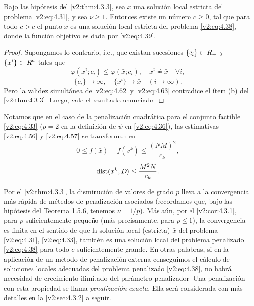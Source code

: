 \begin{corollary}\label{v2:cor:4.3.1}
    Bajo las hipótesis del \cref{v2:thm:4.3.3}, sea $\bar{x}$ una solución local estricta del problema \eqref{v2:eq:4.31}, y sea $\nu \ge 1$.
    Entonces existe un número $\bar{c} \ge 0$, tal que para todo $c > \bar{c}$ el punto $\bar{x}$ es una solución local estricta del problema \eqref{v2:eq:4.38}, donde la función objetivo es dada por \eqref{v2:eq:4.39}.
\end{corollary}
\begin{proof}
    Supongamos lo contrario, i.e., que existan sucesiones $\{c_i\} \subset R_+$ y $\{x^i\} \subset R^n$ tales que
    \begin{equation}
        \varphi(x^i; c_i) \le \varphi(\bar{x}; c_i), \quad x^i \neq \bar{x} \quad \forall i,
        \label{v2:eq:4.62}
    \end{equation}
    \begin{equation}
        \{c_i\} \to \infty, \quad \{x^i\} \to \bar{x} \quad (i \to \infty).
        \label{v2:eq:4.63}
    \end{equation}
    Pero la validez simultánea de \eqref{v2:eq:4.62} y \eqref{v2:eq:4.63} contradice el ítem (b) del \cref{v2:thm:4.3.3}. Luego, vale el resultado anunciado.
\end{proof}

Notamos que en el caso de la penalización cuadrática para el conjunto factible \eqref{v2:eq:4.33} ($p = 2$ en la definición de $\psi$ en \eqref{v2:eq:4.36}), las estimativas \eqref{v2:eq:4.56} y \eqref{v2:eq:4.57} se transforman en
\[
    0 \le f(\bar{x}) - f(x^k) \le \frac{(NM)^2}{c_k},
\]
\[
    \operatorname{dist}(x^k, D) \le \frac{M^2 N}{c_k}.
\]

Por el \cref{v2:thm:4.3.3}, la disminución de valores de grado $p$ lleva a la convergencia más rápida de métodos de penalización asociados (recordamos que, bajo las hipótesis del Teorema 1.5.6, tenemos $\nu = 1/p$). Más aún, por el \cref{v2:cor:4.3.1}, para $p$ suficientemente pequeño (más precisamente, para $p \le 1$), la convergencia es finita en el sentido de que la solución local (estricta) $\bar{x}$ del problema \eqref{v2:eq:4.31}, \eqref{v2:eq:4.33}, también es una solución local del problema penalizado \eqref{v2:eq:4.38} para todo $c$ suficientemente grande. En otras palabras, si en la aplicación de un método de penalización externa conseguimos el cálculo de soluciones locales adecuadas del problema penalizado \eqref{v2:eq:4.38}, no habrá necesidad de crecimiento ilimitado del parámetro penalizador. Una penalización con esta propiedad se llama \textit{penalización exacta}. Ella será considerada con más detalles en la \cref{v2:sec:4.3.2} a seguir.

